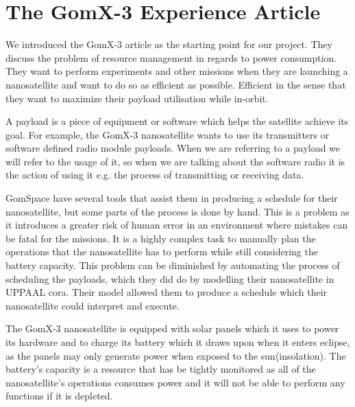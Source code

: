 \section{The GomX-3 Experience Article}
We introduced the GomX-3 article as the starting point for our project. They discuss the problem of resource management in regards to power consumption. They want to perform experiments and other missions when they are launching a nanosatellite and want to do so as efficient as possible. Efficient in the sense that they want to maximize their payload utilisation while in-orbit. 

A payload is a piece of equipment or software which helps the satellite achieve its goal. For example, the GomX-3 nanosatellite wants to use its transmitters or software defined radio module payloads. When we are referring to a payload we will refer to the usage of it, so when we are talking about the software radio it is the action of using it e.g. the process of transmitting or receiving data.

GomSpace have several tools that assist them in producing a schedule for their nanosatellite, but some parts of the process is done by hand. This is a problem as it introduces a greater risk of human error in an environment where mistakes can be fatal for the missions. It is a highly complex task to manually plan the operations that the nanosatellite has to perform while still considering the battery capacity. This problem can be diminished by automating the process of scheduling the payloads, which they did do by modelling their nanosatellite in UPPAAL \gls{cora}. Their model allowed them to produce a schedule which their nanosatellite could interpret and execute.

The GomX-3 nanosatellite is equipped with solar panels which it uses to power its hardware and to charge its battery which it draws upon when it enters eclipse, as the panels may only generate power when exposed to the sun(insolation). The battery's capacity is a resource that has be tightly monitored as all of the nanosatellite's operations consumes power and it will not be able to perform any functions if it is depleted.\cite{gomx3}

